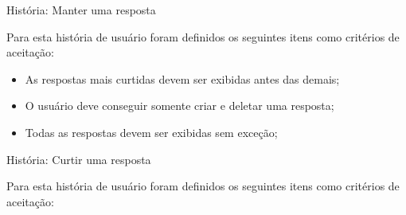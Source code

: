 \def\arraystretch{2}
\begin{quadro}[htb]
\centering
\ABNTEXfontereduzida
\caption[História: Manter uma resposta]{História: Manter uma resposta}
\end{quadro}
\FloatBarrier 

Para esta história de usuário foram definidos os seguintes itens como critérios de aceitação:

\begin{itemize}
\item As respostas mais curtidas devem ser exibidas antes das demais;
\item O usuário deve conseguir somente criar e deletar uma resposta;
\item Todas as respostas devem ser exibidas sem exceção;
\end{itemize}

\def\arraystretch{2}
\begin{quadro}[htb]
\centering
\ABNTEXfontereduzida
\caption[História: Curtir uma resposta]{História: Curtir uma resposta}
\end{quadro}
\FloatBarrier 

Para esta história de usuário foram definidos os seguintes itens como critérios de aceitação:

